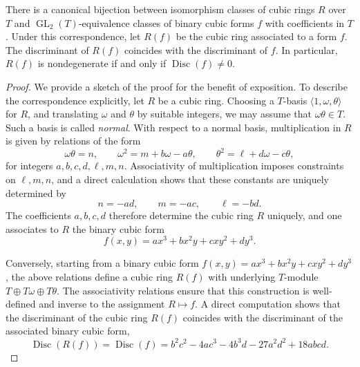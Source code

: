 \documentclass[10pt,a4paper]{amsart}
\newcommand{\op}[1]{\operatorname{#1}}
\begin{document}
\begin{theorem}
There is a canonical bijection between isomorphism classes of cubic rings $R$ over $T$ and
$\op{GL}_{2}(T)$-equivalence classes of binary cubic forms $f$ with coefficients in $T$.
Under this correspondence, let $R(f)$ be the cubic ring associated to a form $f$. The discriminant of $R(f)$ coincides with the
discriminant of $f$. In particular, \(R(f)\) is nondegenerate if and only if \(\op{Disc}(f)\neq 0\).
\end{theorem}

\begin{proof} We provide a sketch of the proof for the benefit of exposition. To describe the correspondence explicitly, let \(R\) be a cubic ring. Choosing a \(T\)-basis \(\langle 1,\omega,\theta\rangle\) for \(R\), and translating \(\omega\) and \(\theta\) by suitable integers, we may assume that \(\omega\theta\in T\). Such a basis is called \emph{normal}. With respect to a normal basis, multiplication in \(R\) is given by relations of the form
\[
\omega\theta = n, \qquad
\omega^{2} = m + b\omega - a\theta, \qquad
\theta^{2} = \ell + d\omega - c\theta,
\]
for integers \(a,b,c,d,\ell,m,n\). Associativity of multiplication imposes constraints on \(\ell,m,n\), and a direct calculation shows that these constants are uniquely determined by
\[
n=-ad, \qquad m=-ac, \qquad \ell=-bd.
\]
The coefficients \(a,b,c,d\) therefore determine the cubic ring \(R\) uniquely, and one associates to \(R\) the binary cubic form
\[
f(x,y)=ax^{3}+bx^{2}y+cxy^{2}+dy^{3}.
\]

Conversely, starting from a binary cubic form \(f(x,y)=ax^{3}+bx^{2}y+cxy^{2}+dy^{3}\), the above relations define a cubic ring \(R(f)\) with underlying \(T\)-module \(T\oplus T\omega\oplus T\theta\). The associativity relations ensure that this construction is well-defined and inverse to the assignment \(R\mapsto f\). A direct computation shows that the discriminant of the cubic ring \(R(f)\) coincides with the discriminant of the associated binary cubic form,
\[
\op{Disc}(R(f))=\op{Disc}(f)
= b^{2}c^{2}-4ac^{3}-4b^{3}d-27a^{2}d^{2}+18abcd.
\]
\end{proof}
\end{document}
